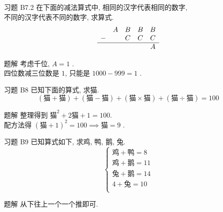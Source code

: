 \documentclass[content.tex]{subfiles}
\begin{document}
\begin{frame}{习题 B7.2}
在下面的减法算式中, 相同的汉字代表相同的数字, \\ 不同的汉字代表不同的数字, 求算式.
$$
\begin{matrix}
  & A & B & B & B \\
- &   & C & C & C \\
\hline
  &   &   &   & A
\end{matrix}
$$
\begin{exampleblock}{题解}
考虑千位, $A=1$ . \\
四位数减三位数是 $1$, 只能是 $1000 - 999 = 1$ .
\end{exampleblock}
\end{frame}

\begin{frame}{习题 B8}
已知下面的算式, 求猫.
$$
(\text{猫} + \text{猫}) + 
(\text{猫} - \text{猫}) + 
(\text{猫} \times \text{猫}) + 
(\text{猫} \div \text{猫}) = 100
$$
\begin{exampleblock}{题解}
整理得到 $\text{猫}^2 + 2\text{猫} + 1 = 100$. \\
配方法得 $(\text{猫} + 1)^2=100\implies \text{猫} = 9$ .
\end{exampleblock}
\end{frame}

\begin{frame}{习题 B9}
已知算式如下, 求鸡, 鸭, 鹅, 兔.
$$
\begin{cases}
\text{鸡} + \text{鸭} = 8 \\
\text{鸡} + \text{鹅} = 11 \\
\text{兔} + \text{鹅} = 14 \\
4 + \text{兔} = 10 \\
\end{cases}
$$
\begin{exampleblock}{题解}
从下往上一个一个推即可.
\end{exampleblock}
\end{frame}
\end{document}
